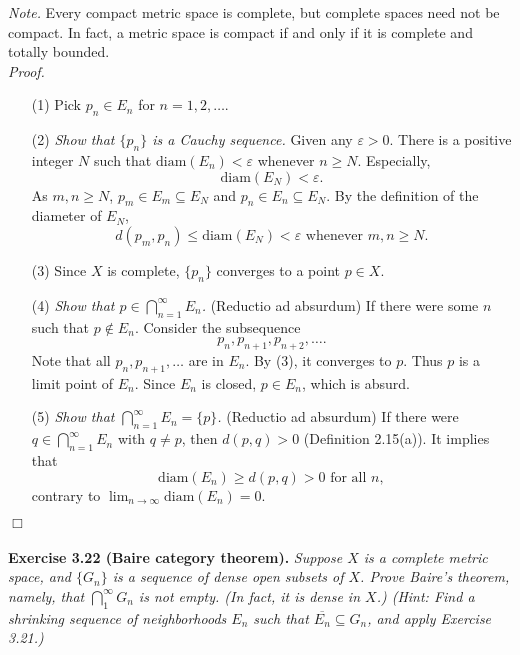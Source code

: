 \documentclass{article}
\begin{document}
\emph{Note.}
Every compact metric space is complete, but complete spaces need not be compact.
In fact, a metric space is compact if and only if it is complete and totally bounded. \\

\emph{Proof.}
\begin{enumerate}
\item[(1)]
Pick $p_n \in E_n$ for $n = 1, 2, \ldots$.
\item[(2)]
\emph{Show that $\{p_n\}$ is a Cauchy sequence.}
Given any $\varepsilon > 0$.
There is a positive integer $N$ such that
$\mathrm{diam}(E_n) < \varepsilon$ whenever $n \geq N$.
Especially, $$\mathrm{diam}(E_N) < \varepsilon.$$
As $m, n \geq N$, $p_m \in E_m \subseteq E_N$ and $p_n \in E_n \subseteq E_N$.
By the definition of the diameter of $E_N$,
$$d(p_m,p_n) \leq \mathrm{diam}(E_N) < \varepsilon \text{ whenever } m,n \geq N.$$
\item[(3)]
Since $X$ is complete, $\{p_n\}$ converges to a point $p \in X$.
\item[(4)]
\emph{Show that $p \in \bigcap_{n=1}^{\infty} E_n$.}
(Reductio ad absurdum)
If there were some $n$ such that $p \not\in E_{n}$.
Consider the subsequence
$$p_{n}, p_{n+1}, p_{n+2}, \ldots.$$
Note that all $p_{n}, p_{n+1}, \ldots$ are in $E_n$.
By (3), it converges to $p$. Thus $p$ is a limit point of $E_n$.
Since $E_n$ is closed, $p \in E_n$, which is absurd.
\item[(5)]
\emph{Show that $\bigcap_{n=1}^{\infty} E_n = \{p\}$.}
(Reductio ad absurdum)
If there were $q \in \bigcap_{n=1}^{\infty} E_n$ with $q \neq p$,
then $d(p,q) > 0$ (Definition 2.15(a)).
It implies that
$$\mathrm{diam}(E_n)
\geq d(p,q) > 0 \text{ for all } n,$$
contrary to $\lim_{n \to \infty} \mathrm{diam}(E_n) = 0$.
\end{enumerate}
$\Box$ \\\\






\textbf{Exercise 3.22 (Baire category theorem).}
\emph{Suppose $X$ is a complete metric space,
and $\{G_n\}$ is a sequence of dense open subsets of $X$.
Prove Baire's theorem, namely, that $\bigcap^\infty_1{G_n}$ is not empty.
(In fact, it is dense in $X$.)
(Hint: Find a shrinking sequence of neighborhoods $E_n$ such
that $\overline{E_n} \subseteq G_n$, and apply Exercise 3.21.) } \\
\end{document}
